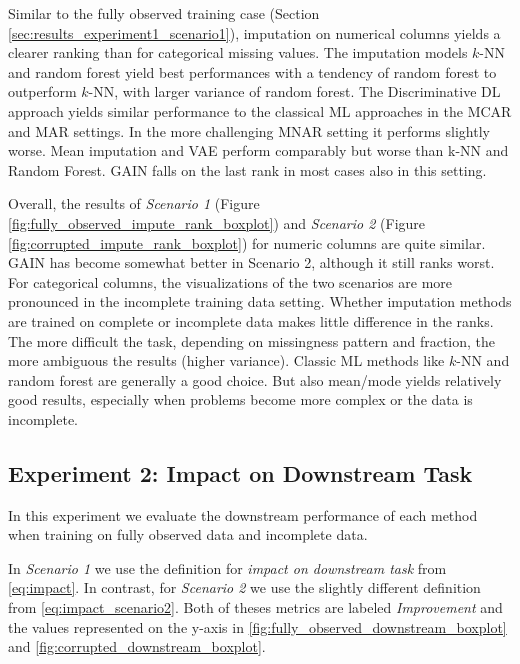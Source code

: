 Similar to the fully observed training case (Section \ref{sec:results_experiment1_scenario1}), imputation on numerical columns yields a clearer ranking than for categorical missing values. The imputation models $k$-NN and random forest yield best performances with a tendency of random forest to outperform $k$-NN, with larger variance of random forest. The Discriminative DL approach yields similar performance to the classical ML approaches in the MCAR and MAR settings. In the more challenging MNAR setting it performs slightly worse. Mean imputation and VAE perform comparably but worse than k-NN and Random Forest. GAIN falls on the last rank in most cases also in this setting.

Overall, the results of \textit{Scenario 1} (Figure \ref{fig:fully_observed_impute_rank_boxplot}) and \textit{Scenario 2} (Figure \ref{fig:corrupted_impute_rank_boxplot}) for numeric columns are quite similar. GAIN has become somewhat better in Scenario 2, although it still ranks worst. For categorical columns, the visualizations of the two scenarios are more pronounced in the incomplete training data setting. Whether imputation methods are trained on complete or incomplete data makes little difference in the ranks. The more difficult the task, depending on missingness pattern and fraction, the more ambiguous the results (higher variance). Classic ML methods like $k$-NN and random forest are generally a good choice. But also mean/mode yields relatively good results, especially when problems become more complex or the data is incomplete.


\subsection{Experiment 2: Impact on Downstream Task}

In this experiment we evaluate the downstream performance of each method when training on fully observed data and incomplete data.

In \textit{Scenario 1} we use the definition for \textit{impact on downstream task} from \autoref{eq:impact}. In contrast, for \textit{Scenario 2} we use the slightly different definition from \autoref{eq:impact_scenario2}. Both of theses metrics are labeled \textit{Improvement} and the values represented on the y-axis in \autoref{fig:fully_observed_downstream_boxplot} and \autoref{fig:corrupted_downstream_boxplot}. 

